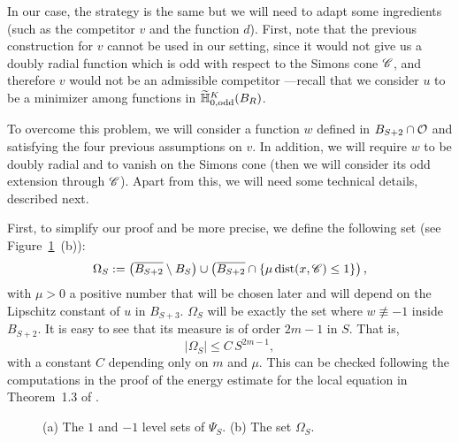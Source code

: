 In our case, the strategy is the same but we will need to adapt some ingredients (such as the competitor $v$ and the function $d$). First, note that the previous construction for $v$ cannot be used in our setting, since it would not give us a doubly radial function which is odd with respect to the Simons cone $\mathscr{C}$, and therefore $v$ would not be an admissible competitor ---recall that we consider $u$ to be a minimizer among functions in $\widetilde{\mathbb{H}}^K_{0, \mathrm{odd}}(B_R)$. 

To overcome this problem, we will consider a function $w$ defined in $B_{S+2}\cap \mathcal{O}$ and satisfying the four previous assumptions on $v$. In addition, we will require $w$ to be doubly radial and to vanish on the Simons cone (then we will consider its odd extension through $\mathscr{C}$). Apart from this, we will need some technical details, described next. 

First, to simplify our proof and be more precise, we define the following set (see Figure~\ref{Fig:PsiSandOmegaS}~(b)):
\begin{equation}
\label{Eq:DefOmegaS}
\Omega_S := \left( \overline{B_{S+2}}\setminus B_S \right) \cup \left(  \overline{B_{S+2}} \cap \{\mu \operatorname{dist}(x,\mathscr{C}) \leq 1\}\right),
\end{equation} 
with $\mu>0$ a positive number that will be chosen later and will depend on the Lipschitz constant of $u$ in $B_{S+3}$. $\Omega_S$ will be exactly the set where $w\not \equiv -1$ inside $B_{S+2}$. It is easy to see that its measure is of order $2m-1$ in $S$. That is,
 \begin{equation}
 \label{Eq:MeasureOmegaS}
 |\Omega_S| \leq C\,S^{2m-1},
 \end{equation}
with a constant $C$ depending only on $m$ and $\mu$. This can be checked following the computations in the proof of the energy estimate for the local equation in Theorem~1.3 of \cite{CabreTerraI}.

\begin{figure}
	\centering
	\begin{subfigure}{0.21\textwidth}
		\centering
		
	\end{subfigure}
	\begin{subfigure}{0.21\textwidth}
		\centering
		
	\end{subfigure}
	\caption{(a) The $1$ and $-1$ level sets of $\Psi_S$. (b) The set $\Omega_S$.}
	\label{Fig:PsiSandOmegaS}
\end{figure}



